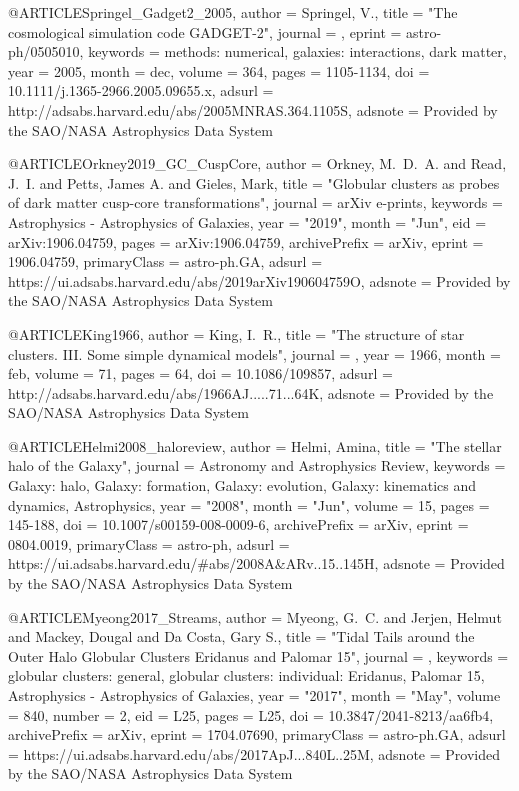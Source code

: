 \documentclass[apj]{emulateapj}
\begin{document}
{{@ARTICLE{Springel_Gadget2_2005,
   author = {{Springel}, V.},
    title = "{The cosmological simulation code GADGET-2}",
  journal = {\mnras},
   eprint = {astro-ph/0505010},
 keywords = {methods: numerical, galaxies: interactions, dark matter},
     year = 2005,
    month = dec,
   volume = 364,
    pages = {1105-1134},
      doi = {10.1111/j.1365-2966.2005.09655.x},
   adsurl = {http://adsabs.harvard.edu/abs/2005MNRAS.364.1105S},
  adsnote = {Provided by the SAO/NASA Astrophysics Data System}
}



@ARTICLE{Orkney2019_GC_CuspCore,
       author = {{Orkney}, M.~D.~A. and {Read}, J.~I. and {Petts}, James A. and
         {Gieles}, Mark},
        title = "{Globular clusters as probes of dark matter cusp-core transformations}",
      journal = {arXiv e-prints},
     keywords = {Astrophysics - Astrophysics of Galaxies},
         year = "2019",
        month = "Jun",
          eid = {arXiv:1906.04759},
        pages = {arXiv:1906.04759},
archivePrefix = {arXiv},
       eprint = {1906.04759},
 primaryClass = {astro-ph.GA},
       adsurl = {https://ui.adsabs.harvard.edu/abs/2019arXiv190604759O},
      adsnote = {Provided by the SAO/NASA Astrophysics Data System}
}





@ARTICLE{King1966,
   author = {{King}, I.~R.},
    title = "{The structure of star clusters. III. Some simple dynamical models}",
  journal = {\aj},
     year = 1966,
    month = feb,
   volume = 71,
    pages = {64},
      doi = {10.1086/109857},
   adsurl = {http://adsabs.harvard.edu/abs/1966AJ.....71...64K},
  adsnote = {Provided by the SAO/NASA Astrophysics Data System}
}



@ARTICLE{Helmi2008_haloreview,
       author = {{Helmi}, Amina},
        title = "{The stellar halo of the Galaxy}",
      journal = {Astronomy and Astrophysics Review},
     keywords = {Galaxy: halo, Galaxy: formation, Galaxy: evolution, Galaxy: kinematics and dynamics, Astrophysics},
         year = "2008",
        month = "Jun",
       volume = {15},
        pages = {145-188},
          doi = {10.1007/s00159-008-0009-6},
archivePrefix = {arXiv},
       eprint = {0804.0019},
 primaryClass = {astro-ph},
       adsurl = {https://ui.adsabs.harvard.edu/\#abs/2008A&ARv..15..145H},
      adsnote = {Provided by the SAO/NASA Astrophysics Data System}
}


@ARTICLE{Myeong2017_Streams,
       author = {{Myeong}, G.~C. and {Jerjen}, Helmut and {Mackey}, Dougal and
         {Da Costa}, Gary S.},
        title = "{Tidal Tails around the Outer Halo Globular Clusters Eridanus and Palomar 15}",
      journal = {\apjl},
     keywords = {globular clusters: general, globular clusters: individual: Eridanus, Palomar 15, Astrophysics - Astrophysics of Galaxies},
         year = "2017",
        month = "May",
       volume = {840},
       number = {2},
          eid = {L25},
        pages = {L25},
          doi = {10.3847/2041-8213/aa6fb4},
archivePrefix = {arXiv},
       eprint = {1704.07690},
 primaryClass = {astro-ph.GA},
       adsurl = {https://ui.adsabs.harvard.edu/abs/2017ApJ...840L..25M},
      adsnote = {Provided by the SAO/NASA Astrophysics Data System}
}


}}
\end{document}
